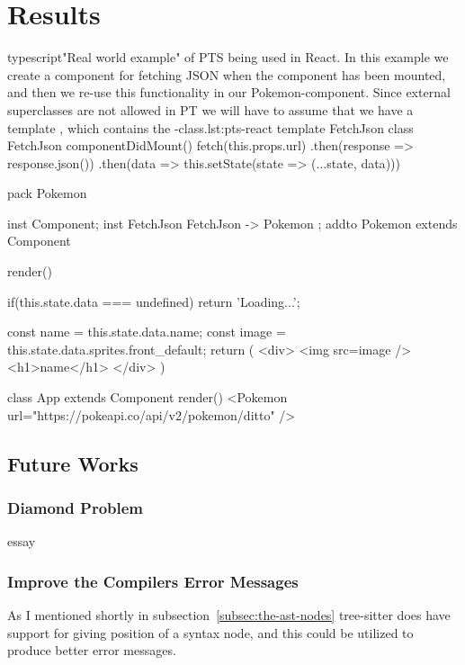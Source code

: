 \chapter{Results}\label{ch:results}

\begin{code}{typescript}{"Real world example" of PTS being used in React. In this example we create a component for fetching JSON when the component has been mounted, and then we re-use this functionality in our Pokemon-component. Since external superclasses are not allowed in PT we will have to assume that we have a template , which contains the -class.}{lst:pts-react}
    template FetchJson {
        class FetchJson {
            componentDidMount() {
                fetch(this.props.url)
                    .then(response => response.json())
                    .then(data =>
                        this.setState(state => ({...state, data})))
            }
        }
    }

    pack Pokemon {
        inst Component;
        inst FetchJson { FetchJson -> Pokemon };
        addto Pokemon extends Component {
            render() {
                if(this.state.data === undefined)
                    return 'Loading...';

                const name = this.state.data.name;
                const image = this.state.data.sprites.front_default;
                return (
                    <div>
                        <img src={image} />
                        <h1>{name}</h1>
                    </div>
                )
            }
        }

        class App extends Component {
            render() {
                <Pokemon url="https://pokeapi.co/api/v2/pokemon/ditto" />
            }
        }
    }
\end{code}

\section{Future Works}\label{sec:future-works}

\subsection{Diamond Problem}\label{subsec:diamond-problem}

essay

\subsection{Improve the Compilers Error Messages}\label{subsec:compiler-with-focus-on-error-messages}

As I mentioned shortly in subsection~\vref{subsec:the-ast-nodes} tree-sitter does have support for giving position of a syntax node, and this could be utilized to produce better error messages.
